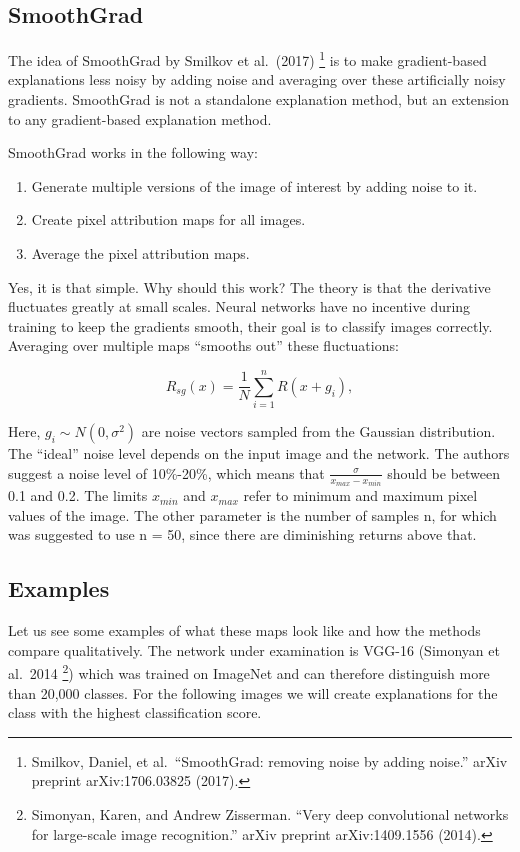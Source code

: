 \documentclass[
  11pt,
]{scrbook}
\providecommand{\tightlist}{%
  \setlength{\itemsep}{0pt}\setlength{\parskip}{0pt}}
\begin{document}
\hypertarget{smoothgrad}{%
\subsection{SmoothGrad}\label{smoothgrad}}

The idea of SmoothGrad by Smilkov et al.~(2017) \footnote{Smilkov, Daniel, et al.~``SmoothGrad: removing noise by adding noise.'' arXiv preprint arXiv:1706.03825 (2017).} is to make gradient-based explanations less noisy by adding noise and averaging over these artificially noisy gradients.
SmoothGrad is not a standalone explanation method, but an extension to any gradient-based explanation method.

SmoothGrad works in the following way:

\begin{enumerate}
\def\labelenumi{\arabic{enumi}.}
\tightlist
\item
  Generate multiple versions of the image of interest by adding noise to it.
\item
  Create pixel attribution maps for all images.
\item
  Average the pixel attribution maps.
\end{enumerate}

Yes, it is that simple.
Why should this work?
The theory is that the derivative fluctuates greatly at small scales.
Neural networks have no incentive during training to keep the gradients smooth, their goal is to classify images correctly.
Averaging over multiple maps ``smooths out'' these fluctuations:

\[R_{sg}(x)=\frac{1}{N}\sum_{i=1}^n{}R(x+g_i),\]

Here, \(g_i\sim{}N(0,\sigma^2)\) are noise vectors sampled from the Gaussian distribution.
The ``ideal'' noise level depends on the input image and the network.
The authors suggest a noise level of 10\%-20\%, which means that \(\frac{\sigma}{x_{max} - x_{min}}\) should be between 0.1 and 0.2.
The limits \(x_{min}\) and \(x_{max}\) refer to minimum and maximum pixel values of the image.
The other parameter is the number of samples n, for which was suggested to use n = 50, since there are diminishing returns above that.

\hypertarget{examples-6}{%
\subsection{Examples}\label{examples-6}}

Let us see some examples of what these maps look like and how the methods compare qualitatively.
The network under examination is VGG-16 (Simonyan et al.~2014 \footnote{Simonyan, Karen, and Andrew Zisserman. ``Very deep convolutional networks for large-scale image recognition.'' arXiv preprint arXiv:1409.1556 (2014).}) which was trained on ImageNet and can therefore distinguish more than 20,000 classes.
For the following images we will create explanations for the class with the highest classification score.
\end{document}
